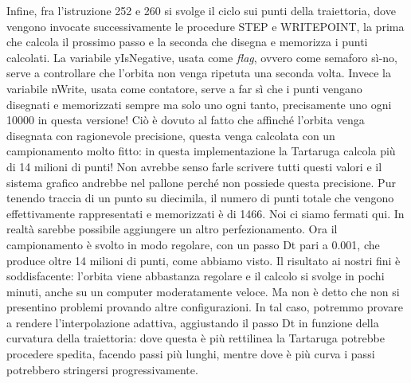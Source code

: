 Infine, fra l'istruzione 252 e 260 si svolge il ciclo sui punti della traiettoria, dove vengono invocate successivamente le procedure STEP e WRITEPOINT, la prima che calcola il prossimo passo e la seconda che disegna e memorizza i punti calcolati. La variabile yIsNegative, usata come \textit{flag}, ovvero come semaforo sì-no, serve a controllare che l'orbita non venga ripetuta una seconda volta.  Invece la variabile nWrite, usata come contatore, serve a far sì che i punti vengano disegnati e memorizzati sempre ma solo uno ogni tanto, precisamente uno ogni 10000 in questa versione! Ciò è dovuto al fatto che affinché l'orbita venga disegnata con ragionevole precisione, questa venga calcolata con un campionamento molto fitto: in questa implementazione la Tartaruga calcola più di 14 milioni di punti! Non avrebbe senso farle scrivere tutti questi valori e il sistema grafico andrebbe nel pallone perché non possiede questa precisione. Pur tenendo traccia di un punto su diecimila, il numero di punti totale che vengono effettivamente rappresentati e memorizzati è di 1466. Noi ci siamo fermati qui. In realtà sarebbe possibile aggiungere un altro perfezionamento. Ora il campionamento è svolto in modo regolare, con un passo Dt pari a 0.001, che produce oltre 14 milioni di punti, come abbiamo visto. Il risultato ai nostri fini è soddisfacente: l'orbita viene abbastanza regolare e il calcolo si svolge in pochi minuti, anche su un computer moderatamente veloce.  Ma non è detto che non si presentino problemi provando altre configurazioni. In tal caso, potremmo provare a rendere l'interpolazione adattiva, aggiustando il passo Dt in funzione della curvatura della traiettoria: dove questa è più rettilinea la Tartaruga potrebbe procedere spedita, facendo passi più lunghi, mentre dove è più curva i passi potrebbero stringersi progressivamente.

